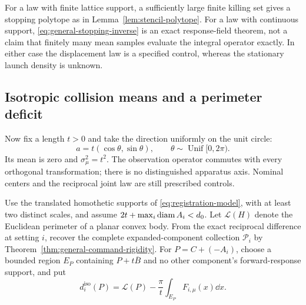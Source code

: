 For a law with finite lattice support, a sufficiently large finite
killing set gives a stopping polytope as in
Lemma~\ref{lem:stencil-polytope}. For a law with continuous support,
\eqref{eq:general-stopping-inverse} is an exact response-field theorem,
not a claim that finitely many mean samples evaluate the integral
operator exactly. In either case the displacement law is a specified
control, whereas the stationary launch density is unknown.

\subsection{Isotropic collision means and a perimeter deficit}
Now fix a length $t>0$ and take the direction uniformly on the unit
circle:
\begin{equation}\label{eq:isotropic-design}
       a=t(\cos\theta,\sin\theta),\qquad
                      \theta\sim\operatorname{Unif}[0,2\pi).
\end{equation}
Its mean is zero and $\sigma_\mu^2=t^2$. The observation operator
commutes with every orthogonal transformation; there is no distinguished
apparatus axis. Nominal centers and the reciprocal joint law are
still prescribed controls.

Use the translated homothetic supports of
\eqref{eq:registration-model}, with at least two distinct scales, and
assume $2t+\max_i\operatorname{diam} A_i<d_0$. Let $\mathcal L(H)$ denote the
Euclidean perimeter of a planar convex body. From the exact reciprocal
difference at setting $i$, recover the complete expanded-component
collection $\mathcal P_i$ by
Theorem~\ref{thm:general-command-rigidity}. For $P=C+(-A_i)$,
choose a bounded region $E_P$ containing $P+t\overline B$ and no
other component's forward-response support, and put
\begin{equation}\label{eq:isotropic-deficit}
 d_i^{\mathrm{iso}}(P)=\mathcal L(P)
                    -\frac{\pi}{t}\int_{E_P}F_{i,\mu}(x)\dd x.
\end{equation}

